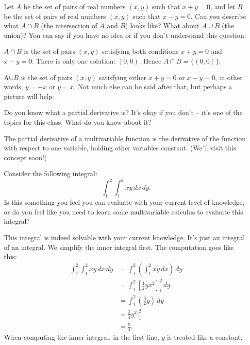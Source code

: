 \begin{question}
  Let $A$ be the set of pairs of real numbers $(x,y)$ such that $x+y=0$, and let $B$ be the set of pairs of real numbers $(x,y)$ such that $x-y=0$. Can you describe what $A\cap B$ (the intersection of $A$ and $B$) looks like? What about $A\cup B$ (the union)? You can say if you have no idea or if you don't understand this question.
\end{question}
\begin{solution}
  $A\cap B$ is the set of pairs $(x,y)$ satisfying both conditions $x+y=0$ and $x-y=0$. There is only one solution: $(0,0)$. Hence $A\cap B=\{(0,0)\}$.

  A$\cup B$ is the set of pairs $(x,y)$ satisfying either $x+y=0$ or $x-y=0$, in other words, $y=-x$ or $y=x$. Not much else can be said after that, but perhaps a picture will help:
  \begin{center}
  \end{center}
\end{solution}

\begin{question}
  Do you know what a partial derivative is? It's okay if you don't -- it's one of the topics for this class. What do you know about it?
\end{question}
\begin{solution}
  The partial derivative of a multivariable function is the derivative of the function with respect to one variable, holding other variables constant. (We'll visit this concept soon!)
\end{solution}

\begin{question}
  Consider the following integral:
  \[\int_1^2\int_1^2 xy\,dx\,dy.\]
  Is this something you feel you can evaluate with your current level of knowledge, or do you feel like you need to learn some multivariable calculus to evaluate this integral?
\end{question}
\begin{solution}
  This integral is indeed solvable with your current knowledge. It's just an integral of an integral. We simplify the inner integral first. The computation goes like this:
  \[\begin{split}
    \int_1^2\int_1^2 xy\,dx\,dy &= \int_1^2\left(\int_1^2 xy\,dx\right)\,dy \\
    &= \int_1^2 \left[ \frac 12 y x^2 \right]_1^2\,dy \\
    &= \int_1^2 \left(\frac 32y\right)\,dy\\
    &= \frac 34y^2\Big|_1^2\\
    &= \frac 94.
  \end{split}\]
  When computing the inner integral, in the first line, $y$ is treated like a constant.
\end{solution}

